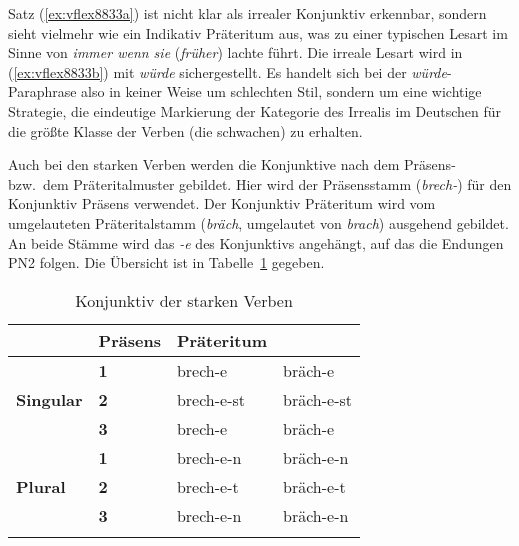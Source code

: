 \begin{exe}
  \ex\label{ex:vflex8833}
  \begin{xlist}
  \end{xlist}
\end{exe}

Satz (\ref{ex:vflex8833a}) ist nicht klar als irrealer Konjunktiv erkennbar, sondern sieht vielmehr wie ein Indikativ Präteritum aus, was zu einer typischen Lesart im Sinne von \textit{immer wenn sie }(\textit{früher}) {lachte} führt.
Die irreale Lesart wird in (\ref{ex:vflex8833b}) mit \textit{würde} sichergestellt.
Es handelt sich bei der \textit{würde}-Paraphrase also in keiner Weise um schlechten Stil, sondern um eine wichtige Strategie, die eindeutige Markierung der Kategorie des Irrealis im Deutschen für die größte Klasse der Verben (die schwachen) zu erhalten.

Auch bei den starken Verben werden die Konjunktive nach dem Präsens- bzw.\ dem Präteritalmuster gebildet.
Hier wird der Präsensstamm (\textit{brech-}) für den Konjunktiv Präsens verwendet.
Der Konjunktiv Präteritum wird vom umgelauteten Präteritalstamm (\textit{bräch}, umgelautet von \textit{brach}) ausgehend gebildet.
An beide Stämme wird das \textit{-e} des Konjunktivs angehängt, auf das die Endungen PN2 folgen.
Die Übersicht ist in Tabelle~\ref{tab:stkonj} gegeben.

\begin{table}
  \centering
  \begin{tabular}{llll}
    \lsptoprule
    \multicolumn{2}{c}{} & \textbf{Präsens} & \textbf{Präteritum} \\
    \midrule
    \multirow{3}{*}{\textbf{Singular}} & \textbf{1} & brech-e & bräch-e \\
    & \textbf{2} & brech-e-st & bräch-e-st \\
    & \textbf{3} & brech-e & bräch-e \\
    \midrule
    \multirow{3}{*}{\textbf{Plural}} & \textbf{1} & brech-e-n & bräch-e-n \\
    & \textbf{2} & brech-e-t & bräch-e-t \\
    & \textbf{3} & brech-e-n & bräch-e-n \\
    \lspbottomrule
  \end{tabular}
  \caption{Konjunktiv der starken Verben}
  \label{tab:stkonj}
\end{table}

